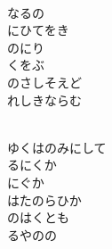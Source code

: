 \documentclass[10pt,b5j]{tarticle} %
\begin{document}
\vspace{1.5em} %
\newcommand{\linespace}{0.5em} %
\newcommand{\blocksize}{0.5\hsize} %
\newcommand{\itemmargin}{3em} %
\begin{enumerate} %
    \setlength{\itemindent}{\itemmargin} %
    \begin{minipage}[c]{\blocksize}
    
        \vspace{\linespace}
        \item~\\
        なるの\\
        にひてをき\\
        のにり\\
        くをぶ\\
        のさしそえど\\
        れしきならむ
        
    \end{minipage}
    \begin{minipage}[c]{\blocksize}
        
        \vspace{\linespace}
        \item~\\
        ゆくはのみにして\\
        るにくか\\
        にぐか\\
        はたのらひか\\
        のはくとも\\
        るやのの
        
    \end{minipage}
    \begin{minipage}[c]{\blocksize}
        

\end{minipage}
\end{enumerate}
\end{document}
